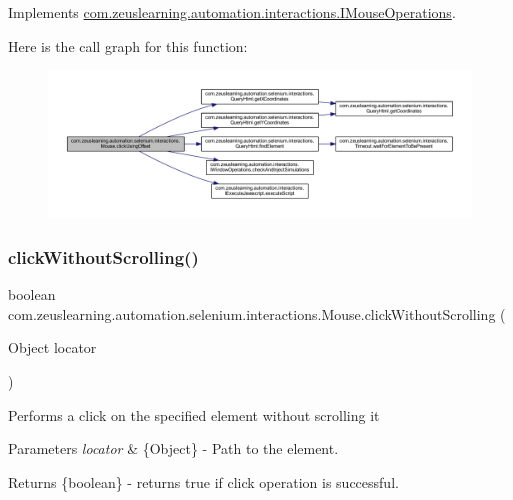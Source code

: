 Implements \hyperlink{interfacecom_1_1zeuslearning_1_1automation_1_1interactions_1_1IMouseOperations_a76821e7ed6d7ca57f9466546e80a1679}{com.\+zeuslearning.\+automation.\+interactions.\+I\+Mouse\+Operations}.

Here is the call graph for this function\+:
\nopagebreak
\begin{figure}[H]
\begin{center}
\leavevmode
\includegraphics[width=350pt]{d0/dfa/classcom_1_1zeuslearning_1_1automation_1_1selenium_1_1interactions_1_1Mouse_a83276a30e86403cc853d19399a9b2817_cgraph}
\end{center}
\end{figure}
\hypertarget{classcom_1_1zeuslearning_1_1automation_1_1selenium_1_1interactions_1_1Mouse_a08be5c1a9eb96f3c8c518b9518f83769}{}\label{classcom_1_1zeuslearning_1_1automation_1_1selenium_1_1interactions_1_1Mouse_a08be5c1a9eb96f3c8c518b9518f83769} 
\subsubsection{\texorpdfstring{click\+Without\+Scrolling()}{clickWithoutScrolling()}}
{\footnotesize\ttfamily boolean com.\+zeuslearning.\+automation.\+selenium.\+interactions.\+Mouse.\+click\+Without\+Scrolling (\begin{DoxyParamCaption}\item[{Object}]{locator }\end{DoxyParamCaption})\hspace{0.3cm}{\ttfamily [inline]}}

Performs a click on the specified element without scrolling it


\begin{DoxyParams}{Parameters}
{\em locator} & \{Object\} -\/ Path to the element. \\
\hline
\end{DoxyParams}
\begin{DoxyReturn}{Returns}
\{boolean\} -\/ returns {\ttfamily true} if click operation is successful. 
\end{DoxyReturn}


